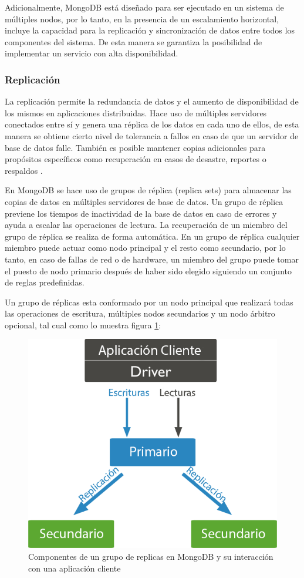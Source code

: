 Adicionalmente, MongoDB \cite{10} está diseñado para ser ejecutado en un sistema de múltiples nodos, por lo tanto,
en la presencia de un escalamiento horizontal, incluye la capacidad para la replicación
y sincronización de datos entre todos los componentes del sistema. De esta manera se garantiza la posibilidad
de implementar un servicio con alta disponibilidad.

\subsubsection{Replicación}

La replicación permite la redundancia de datos y el aumento de disponibilidad de los mismos en aplicaciones distribuidas.
Hace uso de múltiples servidores conectados entre sí y genera una réplica de los datos en cada uno de ellos, de
esta manera se obtiene cierto nivel de tolerancia a fallos en caso de que un servidor de base de datos falle.
También es posible mantener copias adicionales para propósitos específicos como recuperación en casos de desastre,
reportes o respaldos \cite{11}.

En MongoDB se hace uso de grupos de réplica (replica sets) para almacenar las copias de datos en múltiples servidores de base de datos.
Un grupo de réplica previene los tiempos de inactividad de la base de datos
en caso de errores y ayuda a escalar las operaciones de lectura.
La recuperación de un miembro del grupo de
réplica se realiza de forma automática.
En un grupo de réplica cualquier miembro puede actuar como nodo principal
y el resto como secundario, por lo tanto, en caso de fallas de red o de hardware, un miembro del grupo
puede tomar el puesto de nodo primario después de haber sido elegido siguiendo un conjunto de reglas predefinidas.

Un grupo de réplicas esta conformado por un nodo principal que realizará todas las operaciones de escritura, múltiples nodos
secundarios y un nodo árbitro opcional, tal cual como lo muestra figura \ref{fig:replicas}:

\begin{figure}[H]
	\centering
		\includegraphics[width=.6\textwidth]{figures/replicas}
	\caption{Componentes de un grupo de replicas en MongoDB y su interacción con una aplicación cliente}
	\label{fig:replicas}
\end{figure}


